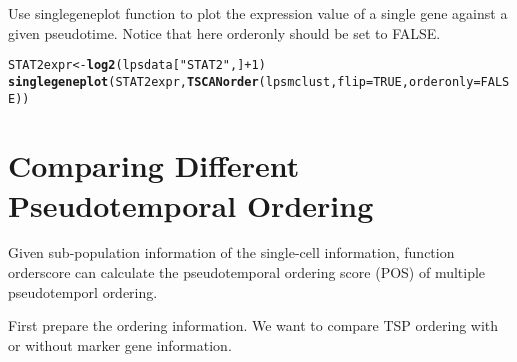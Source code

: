 \documentclass[10pt,oneside]{article}\usepackage[]{graphicx}\usepackage[]{color}
\makeatletter
\newcommand{\hlnum}[1]{\textcolor[rgb]{0.686,0.059,0.569}{#1}}%
\newcommand{\hlstr}[1]{\textcolor[rgb]{0.192,0.494,0.8}{#1}}%
\newcommand{\hlopt}[1]{\textcolor[rgb]{0,0,0}{#1}}%
\newcommand{\hlstd}[1]{\textcolor[rgb]{0.345,0.345,0.345}{#1}}%
\newcommand{\hlkwb}[1]{\textcolor[rgb]{0.69,0.353,0.396}{#1}}%
\newcommand{\hlkwc}[1]{\textcolor[rgb]{0.333,0.667,0.333}{#1}}%
\newcommand{\hlkwd}[1]{\textcolor[rgb]{0.737,0.353,0.396}{\textbf{#1}}}%
\newenvironment{kframe}{%
 \def\at@end@of@kframe{}%
 \ifinner\ifhmode%
  \def\at@end@of@kframe{\end{minipage}}%
  \begin{minipage}{\columnwidth}%
 \fi\fi%
 \def\FrameCommand##1{\hskip\@totalleftmargin \hskip-\fboxsep
 \colorbox{shadecolor}{##1}\hskip-\fboxsep
     \hskip-\linewidth \hskip-\@totalleftmargin \hskip\columnwidth}%
 \MakeFramed {\advance\hsize-\width
   \@totalleftmargin\z@ \linewidth\hsize
   \@setminipage}}%
 {\par\unskip\endMakeFramed%
 \at@end@of@kframe}
\newenvironment{knitrout}{}{} %
\makeatother
\begin{document}
Use singlegeneplot function to plot the expression value of a single gene against a given pseudotime. Notice that here orderonly should be set to FALSE.
\begin{knitrout}
\color{fgcolor}\begin{kframe}
\begin{alltt}
\hlstd{STAT2expr} \hlkwb{<-} \hlkwd{log2}\hlstd{(lpsdata[}\hlstr{"STAT2"}\hlstd{,]}\hlopt{+}\hlnum{1}\hlstd{)}
\hlkwd{singlegeneplot}\hlstd{(STAT2expr,} \hlkwd{TSCANorder}\hlstd{(lpsmclust,}\hlkwc{flip}\hlstd{=}\hlnum{TRUE}\hlstd{,}\hlkwc{orderonly}\hlstd{=}\hlnum{FALSE}\hlstd{))}
\end{alltt}


{\ttfamily\noindent\bfseries{}}\end{kframe}
\end{knitrout}

\section{Comparing Different Pseudotemporal Ordering}

Given sub-population information of the single-cell information, function orderscore can calculate the pseudotemporal ordering score (POS) of multiple pseudotemporl ordering.

First prepare the ordering information. We want to compare TSP ordering with or without marker gene information.
\end{document}

